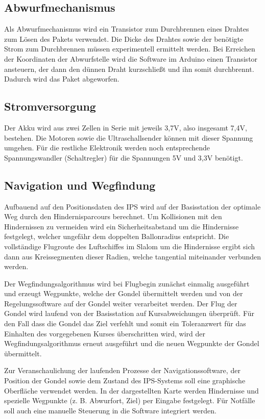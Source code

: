\documentclass[lang=ngerman,inputenc=utf8,fontsize=10pt]{ldvarticle}
\begin{document}
\subsection*{Abwurfmechanismus}
Als Abwurfmechanismus wird ein Transistor zum Durchbrennen eines Drahtes zum Lösen des Pakets verwendet. Die Dicke des Drahtes sowie der benötigte Strom zum Durchbrennen müssen experimentell ermittelt werden. Bei Erreichen der Koordinaten der Abwurfstelle wird die Software im Arduino einen Transistor ansteuern, der dann den dünnen Draht kurzschließt und ihn somit durchbrennt. Dadurch wird das Paket abgeworfen.
\subsection*{Stromversorgung}
Der Akku wird aus zwei Zellen in Serie mit jeweils 3,7V, also insgesamt 7,4V, bestehen. Die Motoren sowie die Ultraschallsender können mit dieser Spannung umgehen. Für die restliche Elektronik werden noch entsprechende Spannungswandler (Schaltregler) für die Spannungen 5V und 3,3V benötigt.
\subsection*{Navigation und Wegfindung}
Aufbauend auf den Positionsdaten des IPS wird auf der Basisstation der optimale Weg durch den Hindernisparcours berechnet. Um Kollisionen mit den Hindernissen zu vermeiden wird ein Sicherheitsabstand um die Hindernisse festgelegt, welcher ungefähr dem doppelten Ballonradius entspricht. Die vollständige Flugroute des Luftschiffes im Slalom um die Hindernisse ergibt sich dann aus Kreissegmenten dieser Radien, welche tangential miteinander verbunden werden.


Der Wegfindungsalgorithmus wird bei Flugbegin zunächst einmalig ausgeführt und erzeugt Wegpunkte, welche der Gondel übermittelt werden und von der Regelungssoftware auf der Gondel weiter verarbeitet werden. Der Flug der Gondel wird laufend von der Basisstation auf Kursabweichungen überprüft. Für den Fall dass die Gondel das Ziel verfehlt und somit ein Toleranzwert für das Einhalten des vorgegebenen Kurses überschritten wird, wird der Wegfindungsalgorithmus erneut ausgeführt und die neuen Wegpunkte der Gondel übermittelt.


Zur Veranschaulichung der laufenden Prozesse der Navigationssoftware, der Position der Gondel sowie dem Zustand des IPS-Systems soll eine graphische Oberfläche verwendet werden. In der dargestellten Karte werden Hindernisse und spezielle Wegpunkte (z. B. Abwurfort, Ziel) per Eingabe festgelegt. Für Notfälle soll auch eine manuelle Steuerung in die Software integriert werden.
\end{document}
